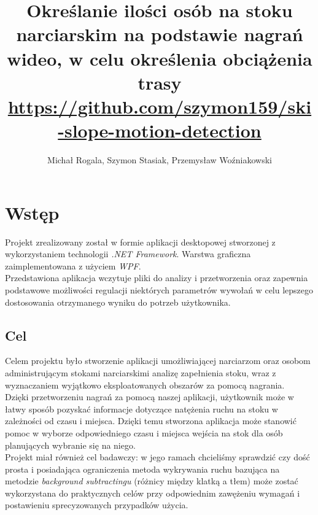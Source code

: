 \documentclass[a4paper]{article}
\title{Określanie ilości osób na stoku narciarskim na podstawie nagrań wideo, w celu określenia obciążenia trasy\\
\small \url{https://github.com/szymon159/ski-slope-motion-detection}}
\date{}
\author{Michał Rogala, Szymon Stasiak, Przemysław Woźniakowski}
\begin{document}
  \maketitle

\section{Wstęp}
Projekt zrealizowany został w formie aplikacji desktopowej stworzonej z wykorzystaniem technologii \textit{.NET Framework}. Warstwa graficzna zaimplementowana z użyciem \textit{WPF}.\\
Przedstawiona aplikacja wczytuje pliki do analizy i przetworzenia oraz zapewnia podstawowe możliwości regulacji niektórych parametrów wywołań w celu lepszego dostosowania otrzymanego wyniku do potrzeb użytkownika.

\subsection{Cel}
Celem projektu było stworzenie aplikacji umożliwiającej narciarzom oraz osobom administrującym stokami narciarskimi analizę zapełnienia stoku, wraz z wyznaczaniem wyjątkowo eksploatowanych obszarów za pomocą nagrania.\\
Dzięki przetworzeniu nagrań za pomocą naszej aplikacji, użytkownik może w łatwy sposób pozyskać informacje dotyczące natężenia ruchu na stoku w zależności od czasu i miejsca. Dzięki temu stworzona aplikacja może stanowić pomoc w wyborze odpowiedniego czasu i miejsca wejścia na stok dla osób planujących wybranie się na niego.\\
Projekt miał również cel badawczy: w jego ramach chcieliśmy sprawdzić czy dość prosta i posiadająca ograniczenia metoda wykrywania ruchu bazująca na metodzie \textit{background subtractingu} (różnicy między klatką a tłem) może zostać wykorzystana do praktycznych celów przy odpowiednim zawężeniu wymagań i postawieniu sprecyzowanych przypadków użycia.
\end{document}
